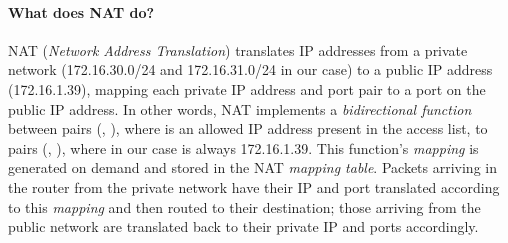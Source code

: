 \documentclass[compilation.tex]{subfiles}
\begin{document}
\paragraph{What does NAT do?}
NAT (\textsl{Network Address Translation}) translates IP addresses from a private network (172.16.30.0/24 and 172.16.31.0/24 in our case) to a public IP address (172.16.1.39), mapping each private IP address and port pair to a port on the public IP address. In other words, NAT implements a \textsl{bidirectional function} between pairs (, ), where  is an allowed IP address present in the access list, to pairs (, ), where  in our case is always 172.16.1.39. This function's \textsl{mapping} is generated on demand and stored in the NAT \textsl{mapping table}. Packets arriving in the router from the private network have their IP and port translated according to this \textsl{mapping} and then routed to their destination; those arriving from the public network are translated back to their private IP and ports accordingly.
\end{document}
